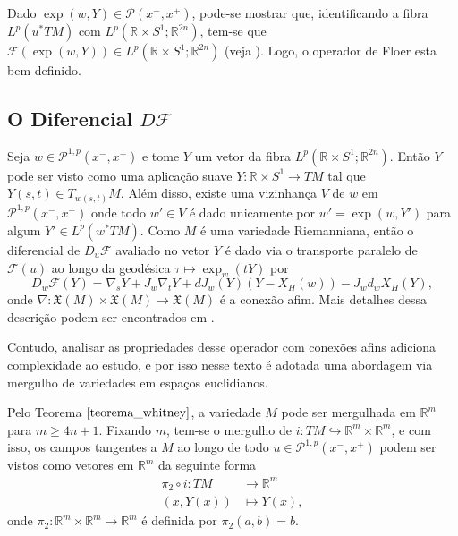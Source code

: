 \documentclass[12pt]{book}
\newcommand{\caminhosexponenciaisconectantesabrev}{\mathcal{P}(x^{-},x^{+})}
\newcommand{\caminhosexponenciaisconectantes}[2]{\mathcal{P}^{1,p}(#1, #2)}
\newcommand{\caminhosexponenciaisconectantespadrao}{\caminhosexponenciaisconectantes{x^{-}}{x^{+}}}
\newcommand{\campossuaves}[1]{\mathfrak{X}(#1)}
\newcommand{\circulo}{S^{1}}
\newcommand{\diferencialfloer}{D\operadorFloer}
\newcommand{\diferencialfloerponto}[1]{D_{#1}\operadorFloer}
\newcommand{\espacoLp}[1]{L^{p}(#1)}
\newcommand{\espacotangenteponto}[2]{T_{#1}#2}
\newcommand{\operadorFloer}{\mathcal{F}}
\newcommand{\operadorFloerParametro}[1]{\mathcal{F}(#1)}
\newcommand{\pullbackfibradotangente}[2]{#1^{*}T#2}
\newcommand{\pullbackfibradotangenteM}[1]{\pullbackfibradotangente{#1}{M}}
\newcommand{\retacartesianocirculo}{\real{} \times \circulo}
\newcommand{\real}[1]{\mathbb{R}^{#1}}
\begin{document}
	Dado $\exp(w,Y) \in \caminhosexponenciaisconectantesabrev$, pode-se mostrar que, identificando a fibra $\espacoLp{\pullbackfibradotangenteM{u}}$ com $\espacoLp{\retacartesianocirculo;\real{2n}}$, tem-se que $\operadorFloerParametro{\exp(w,Y)}\in \espacoLp{\retacartesianocirculo;\real{2n}}$ (veja \cite{audi_floer_homology}). Logo, o operador de Floer esta bem-definido.
	
	\subsection{O Diferencial $\diferencialfloer$}\label{secao_operador_floer}
	
	Seja $w \in \caminhosexponenciaisconectantespadrao$ e tome $Y $ um vetor da fibra $ \espacoLp{\retacartesianocirculo;\real{2n}}$. Então $Y$ pode ser visto como uma aplicação suave $Y:\retacartesianocirculo\to TM$ tal que $Y(s,t)\in \espacotangenteponto{w(s,t)}{M}$. Além disso, existe uma vizinhança $V$ de $w$ em $\caminhosexponenciaisconectantespadrao$ onde todo $w' \in V$ é dado unicamente por $w'=\exp(w, Y')$ para algum $Y'\in \espacoLp{\pullbackfibradotangenteM{w}}$. Como $M$ é uma variedade Riemanniana, então o diferencial de $\diferencialfloerponto{u}$ avaliado no vetor $Y$ é dado via o transporte paralelo de $\operadorFloerParametro{u}$ ao longo da geodésica $\tau \mapsto \exp_{w}(tY)$ por 
	$$
	\diferencialfloerponto{w}(Y) = \nabla_{s}Y + J_{w}\nabla_{t}Y + dJ_{w}(Y)(Y - X_{H}(w)) - J_{w}d_{w}X_{H}(Y),
	$$
	onde $\nabla:\campossuaves{M}\times \campossuaves{M} \to \campossuaves{M}$ é a conexão afim. Mais detalhes dessa descrição podem ser encontrados em \cite{salamon_lecture}. 
	
	Contudo, analisar as propriedades desse operador com conexões afins adiciona complexidade ao estudo, e por isso nesse texto é adotada uma abordagem via mergulho de variedades em espaços euclidianos.
	
	Pelo Teorema $\ref{teorema_whitney}$, a variedade $M$ pode ser mergulhada em $\real{m}$ para $m\geq 4n+1$. Fixando $m$, tem-se o mergulho de $i: TM \hookrightarrow \real{m}\times\real{m}$, e com isso, os campos tangentes a $M$ ao longo de todo $u \in \caminhosexponenciaisconectantespadrao$ podem ser vistos como vetores em $\real{m}$ da seguinte forma
	$$
	\begin{aligned}
	\pi_{2}\circ i : TM &\to \real{m}
	\\
	(x, Y(x)) &\mapsto Y(x),
	\end{aligned}
	$$
	onde $\pi_{2}:\real{m}\times \real{m}\to \real{m} 
	$ é definida por $\pi_{2}(a,b) = b$.
	
\end{document}
